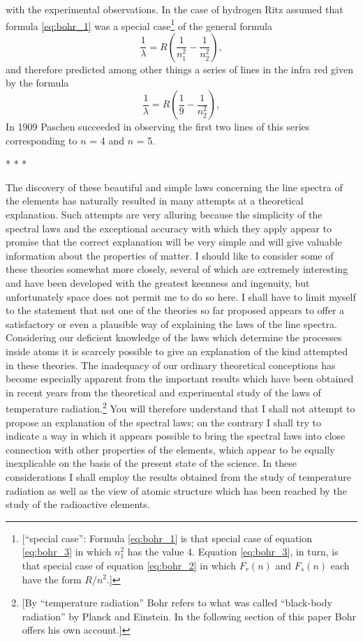 with the experimental observations. In the case of hydrogen Ritz assumed
that formula \eqref{eq:bohr_1} was a special case\footnote{{[}``special case'':
  Formula \eqref{eq:bohr_1} is that special case of equation \eqref{eq:bohr_3}
  in which $n_1^2$
  has the value 4. Equation \eqref{eq:bohr_3}, in turn, is that special case of equation
  \eqref{eq:bohr_2} in which $F_r(n)$ and $F_s(n)$ each have
  the form $R/n^2$.]} of the general formula
%
\begin{equation}\label{eq:bohr_3}
\frac{1}{\lambda} = R\left(\frac{1}{n_1^2} - \frac{1}{n_2^2}\right) ,
\end{equation}
%
and therefore predicted among other things a series of lines in the
infra red given by the formula
%
\begin{equation*}
\frac{1}{\lambda} = R\left(\frac{1}{9} - \frac{1}{n_2^2}\right) ,
\end{equation*}
%
In 1909 Paschen succeeded in observing the first two lines of this
series corresponding to $n$ = 4 and $n$ = 5.\\
\centerline{* * *}
%
The discovery of these beautiful and simple laws concerning the line
spectra of the elements has naturally resulted in many attempts at a
theoretical explanation. Such attempts are very alluring because the
simplicity of the spectral laws and the exceptional accuracy with which
they apply appear to promise that the correct explanation will be very
simple and will give valuable information about the properties of
matter. I should like to consider some of these theories somewhat more
closely, several of which are extremely interesting and have been
developed with the greatest keenness and ingenuity, but unfortunately
space does not permit me to do so here. I shall have to limit myself to
the statement that not one of the theories so far proposed appears to
offer a satisfactory or even a plausible way of explaining the laws of
the line spectra. Considering our deficient knowledge of the laws which
determine the processes inside atoms it is scarcely possible to give an
explanation of the kind attempted in these theories. The inadequacy of
our ordinary theoretical conceptions has become especially apparent from
the important results which have been obtained in recent years from the
theoretical and experimental study of the laws of temperature
radiation.\footnote{{[}By ``temperature radiation'' Bohr refers to what
  was called ``black-body radiation'' by Planck and Einstein. In the
  following section of this paper Bohr offers his own account.{]}} You
will therefore understand that I shall not attempt to propose an
explanation of the spectral laws; on the contrary I shall try to
indicate a way in which it appears possible to bring the spectral laws
into close connection with other properties of the elements, which
appear to be equally inexplicable on the basis of the present state of
the science. In these considerations I shall employ the results obtained
from the study of temperature radiation as well as the view of atomic
structure which has been reached by the study of the radioactive
elements.

